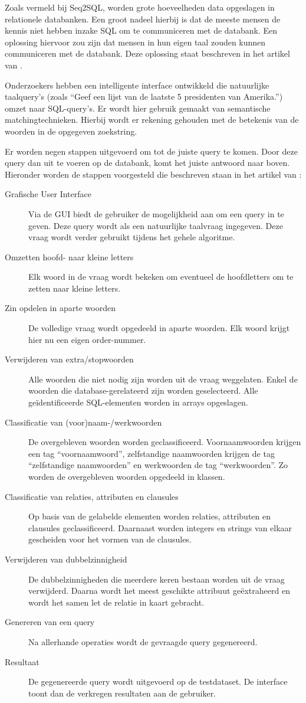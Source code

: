 Zoals vermeld bij Seq2SQL, worden grote hoeveelheden data opgeslagen in relationele databanken. Een groot nadeel hierbij is dat de meeste mensen de kennis niet hebben inzake SQL om te communiceren met de databank. Een oplossing hiervoor zou zijn dat mensen in hun eigen taal zouden kunnen communiceren met de databank. Deze oplossing staat beschreven in het artikel van \textcite{nlidbs}.

Onderzoekers hebben een intelligente interface ontwikkeld die natuurlijke taalquery’s (zoals “Geef een lijst van de laatste 5 presidenten van Amerika.”) omzet naar SQL-query’s. Er wordt hier gebruik gemaakt van semantische matchingtechnieken. Hierbij wordt er rekening gehouden met de betekenis van de woorden in de opgegeven zoekstring. 

Er worden negen stappen uitgevoerd om tot de juiste query te komen. Door deze query dan uit te voeren op de databank, komt het juiste antwoord naar boven. Hieronder worden de stappen voorgesteld die beschreven staan in het artikel van \textcite{nlidbs}:

\begin{description}
	\item[Grafische User Interface] Via de GUI biedt de gebruiker de mogelijkheid aan om een query in te geven. Deze query wordt als een natuurlijke taalvraag ingegeven. Deze vraag wordt verder gebruikt tijdens het gehele algoritme.
	\item[Omzetten hoofd- naar kleine letters] Elk woord in de vraag wordt bekeken om eventueel de hoofdletters om te zetten naar kleine letters.
	\item[Zin opdelen in aparte woorden] De volledige vraag wordt opgedeeld in aparte woorden. Elk woord krijgt hier nu een eigen order-nummer.
	\item[Verwijderen van extra/stopwoorden] Alle woorden die niet nodig zijn worden uit de vraag weggelaten. Enkel de woorden die database-gerelateerd zijn worden geselecteerd. Alle geïdentificeerde SQL-elementen worden in arrays opgeslagen.
	\item[Classificatie van (voor)naam-/werkwoorden] De overgebleven woorden worden geclassificeerd. Voornaamwoorden krijgen een tag “voornaamwoord”, zelfstandige naamwoorden krijgen de tag “zelfstandige naamwoorden” en werkwoorden de tag “werkwoorden”. Zo worden de overgebleven woorden opgedeeld in klassen.
	\item[Classificatie van relaties, attributen en clausules] Op basis van de gelabelde elementen worden relaties, attributen en clausules geclassificeerd. Daarnaast worden integers en strings van elkaar gescheiden voor het vormen van de clausules.
	\item[Verwijderen van dubbelzinnigheid] De dubbelzinnigheden die meerdere keren bestaan worden uit de vraag verwijderd. Daarna wordt het meest geschikte attribuut geëxtraheerd en wordt het samen let de relatie in kaart gebracht.
	\item[Genereren van een query] Na allerhande operaties wordt de gevraagde query gegenereerd.
	\item[Resultaat] De gegenereerde query wordt uitgevoerd op de testdataset. De interface toont dan de verkregen resultaten aan de gebruiker.
\end{description}

